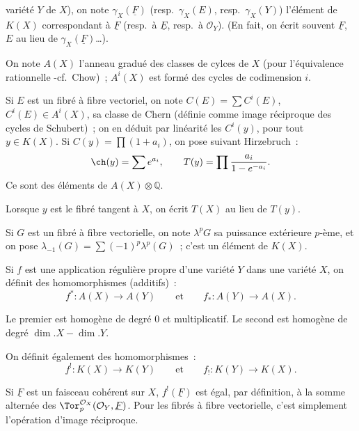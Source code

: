 variété \(Y\) de \(X\)), on note \(\gamma_X(\underline F)\) (resp.\ \(\gamma_X(E)\), resp.\ \(\gamma_X(Y)\)) l'élément de \(K(X)\) correspondant à \(\underline F\) (resp.\ à \(\underline E\), resp.\ à \(\mathcal O_Y\)). (En fait, on écrit souvent \(\underline F\), \(E\) au lieu de \(\gamma_X(\underline F)\)\dots).

On note \(A(X)\) l'anneau gradué des classes de cylces de \(X\) (pour l'équivalence rationnelle -cf.\ Chow)~; \(A^i(X)\) est formé des cycles de codimension \(i\).

Si \(E\) est un fibré à fibre vectoriel, on note \(C(E)=\sum C^i(E)\), \(C^i(E)\in A^i(X)\), sa classe de Chern (définie comme image réciproque des cycles de Schubert)~; on en déduit par linéarité les \(C^i(y)\), pour tout \(y\in K(X)\). Si \(C(y)=\prod(1+a_i)\), on pose suivant Hirzebruch~:
\[
  \ch(y)=\sum e^{a_i},\qquad
  T(y)=\prod\frac{a_i}{1-e^{-a_i}}.
\]
Ce sont des éléments de \(A(X)\otimes\mathbb Q\).

Lorsque \(y\) est le fibré tangent à \(X\), on écrit \(T(X)\) au lieu de \(T(y)\).

Si \(G\) est un fibré à fibre vectorielle, on note \(\lambda^pG\) sa puissance extérieure \(p\)-ème, et on pose \(\lambda_{-1}(G)=\sum(-1)^p\lambda^p(G)\)~; c'est un élément de \(K(X)\).

Si \(f\) est une application régulière propre d'une variété \(Y\) dans une variété \(X\), on définit des homomorphismes (additifs)~:
\[
  f^*:A(X)\longrightarrow A(Y)\qquad\text{et}\qquad
  f_*:A(Y)\longrightarrow A(X).
\]

Le premier est homogène de degré \(0\) et multiplicatif. Le second est homogène de degré \(\dim.X-\dim.Y\).

On définit également des homomorphismes~:
\[
  f^!:K(X)\longrightarrow K(Y)\qquad\text{et}\qquad
  f_!:K(Y)\longrightarrow K(X).
\]

Si \(\underline F\) est un faisceau cohérent sur \(X\), \(f^!(\underline F)\) est égal, par définition, à la somme alternée des \(\Tor_p^{\mathcal O_X}(\mathcal O_Y,\underline F)\). Pour les fibrés à fibre vectorielle, c'est simplement l'opération d'image réciproque.

